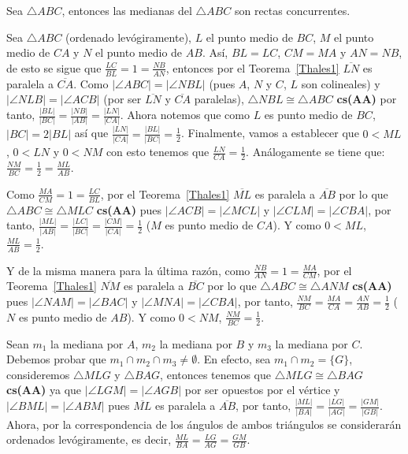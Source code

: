 \begin{teo}\label{LMC}
Sea $\triangle ABC$, entonces las medianas del $\triangle ABC$ son rectas concurrentes.
\end{teo}
\begin{dem}
Sea $\triangle ABC$ (ordenado levógiramente), $L$ el punto medio de $BC$, $M$ el punto medio de $CA$ y $N$ el punto medio de $AB$. Así, $BL=LC$, $CM=MA$ y $AN=NB$, de esto se sigue que $\frac{LC}{BL}=1=\frac{NB}{AN}$, entonces por el Teorema~\ref{Thales1} $\overline{LN}$ es paralela a $\overline{CA}$.
Como $|\angle ABC|=|\angle NBL|$ (pues $A$, $N$ y $C$, $L$ son colineales) y $|\angle NLB|=|\angle ACB|$ (por ser $\overline{LN}$ y $\overline{CA}$ paralelas), $\triangle NBL\cong\triangle ABC$ \textbf{cs(AA)} por tanto, $\frac{|BL|}{|BC|}=\frac{|NB|}{|AB|}=\frac{|LN|}{|CA|}$. Ahora notemos que como $L$ es punto medio de $BC$, $|BC|=2|BL|$ así que $\frac{|LN|}{|CA|}=\frac{|BL|}{|BC|}=\frac{1}{2}$. Finalmente, vamos a establecer que $0<ML$, $0<LN$ y $0<NM$ con esto tenemos que $\frac{LN}{CA}=\frac{1}{2}.$
Análogamente se tiene que: $\frac{NM}{BC}=\frac{1}{2}=\frac{ML}{AB}$. 

Como $\frac{MA}{CM}=1=\frac{LC}{BL}$, por el Teorema~\ref{Thales1} $\overline{ML}$ es paralela a $\overline{AB}$ por lo que $\triangle ABC\cong\triangle MLC$ \textbf{cs(AA)} pues $|\angle ACB|=|\angle MCL|$ y $|\angle CLM|=|\angle CBA|$, por tanto, $\frac{|ML|}{|AB|}=\frac{|LC|}{|BC|}=\frac{|CM|}{|CA|}=\frac{1}{2}$ ($M$ es punto medio de $CA$). Y como $0<ML$, $\frac{ML}{AB}=\frac{1}{2}$. 

Y de la misma manera para la última razón, como $\frac{NB}{AN}=1=\frac{MA}{CM}$, por el Teorema~\ref{Thales1} $\overline{NM}$ es paralela a $\overline{BC}$ por lo que $\triangle ABC\cong\triangle ANM$ \textbf{cs(AA)} pues $|\angle NAM|=|\angle BAC|$ y $|\angle MNA|=|\angle CBA|$, por tanto, $\frac{NM}{BC}=\frac{MA}{CA}=\frac{AN}{AB}=\frac{1}{2}$ ($N$ es punto medio de $AB$). Y como $0<NM$, $\frac{NM}{BC}=\frac{1}{2}$.

Sean $m_{1}$ la mediana por $A$, $m_{2}$ la mediana por $B$ y $m_{3}$ la mediana por $C$. Debemos probar que $m_{1}\cap m_{2}\cap m_{3}\neq\emptyset$. 
En efecto, sea $m_{1}\cap m_{2}=\{G\}$, consideremos $\triangle MLG$ y $\triangle BAG$, entonces tenemos que $\triangle MLG\cong\triangle BAG$ \textbf{cs(AA)} ya que $|\angle LGM|=|\angle AGB|$ por ser opuestos por el vértice y $|\angle BML|=|\angle ABM|$ pues $\overline{ML}$ es paralela a $\overline{AB}$, por tanto, $\frac{|ML|}{|BA|}=\frac{|LG|}{|AG|}=\frac{|GM|}{|GB|}$. Ahora, por la correspondencia de los ángulos de ambos triángulos se considerarán ordenados levógiramente, es decir, $\frac{ML}{BA}=\frac{LG}{AG}=\frac{GM}{GB}$.


\end{dem}
